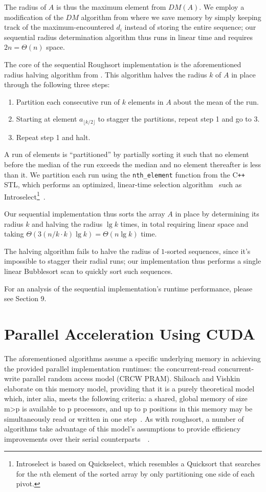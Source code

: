 \documentclass[letterpaper, 12pt]{article}
\let\supercite\cite
\renewcommand{\cite}[1]{\textnormal{~\supercite{#1}}}
\begin{document}
The radius of $A$ is thus the maximum element from $DM(A)$. We employ a modification of the $DM$ algorithm from
  \supercite{altman89} where we save memory by simply keeping track of the maximum-encountered $d_i$ instead of storing the
  entire sequence; our sequential radius determination algorithm thus runs in linear time and requires $2n = \Theta(n)$ space.

The core of the sequential Roughsort implementation is the aforementioned radius halving algorithm from \supercite{altman89}.
This algorithm halves the radius $k$ of $A$ in place through the following three steps:
\begin{enumerate}\setlength{\itemsep}{0pt}\setlength{\parskip}{0pt}
\item Partition each consecutive run of $k$ elements in $A$ about the mean of the run.
\item Starting at element $a_{\lfloor k/2 \rfloor}$ to stagger the partitions, repeat step 1 and go to 3.
\item Repeat step 1 and halt.
\end{enumerate}
A run of elements is ``partitioned'' by partially sorting it such that no element before the median of the run exceeds
  the median and no element thereafter is less than it.
We partition each run using the \texttt{nth_element} function from the  C\texttt{++} STL, which performs an optimized,
  linear-time selection algorithm\cite{clrs} such as
  Introselect\footnote{Introselect is based on Quickselect, which resembles a Quicksort
  that searches for the $n$th element of the sorted array by only partitioning one side of each pivot.}\cite{selectalg}.

Our sequential implementation thus sorts the array $A$ in place by determining its radius $k$ and halving the radius
  $\lg k$ times, in total requiring linear space and taking $\Theta(3(n/k \cdot k) \lg k) = \Theta(n \lg k)$ time.

The halving algorithm fails to halve the radius of $1$-sorted sequences, since it's impossible to stagger their radial runs;
  our implementation thus performs a single linear Bubblesort scan to quickly sort such sequences.

For an analysis of the sequential implementation's runtime performance, please see Section 9.

\section{Parallel Acceleration Using CUDA}
  The aforementioned algorithms assume a specific underlying memory in achieving the provided parallel implementation runtimes: the concurrent-read concurrent-write parallel random access model (CRCW PRAM).  Shiloach and Vishkin elaborate on this memory model, providing that it is a purely theoretical model which, inter alia, meets the following criteria: a shared, global memory of size m\textgreater p is available to p processors, and up to p positions in this memory may be simultaneously read or written in one step\cite{Shiloach1981}.  As with roughsort, a number of algorithms take advantage of this model\textquoteright s assumptions to provide efficiency improvements over their serial counterparts\cite{Shiloach1982}\cite{raj1989}.
\end{document}
